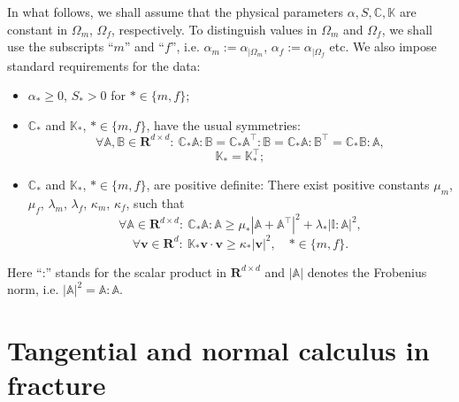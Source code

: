 \documentclass[a4paper]{article}
\numberwithin{equation}{section}
\def\CC{\tn C}
\def\Real{{\mathbf R}} %
\def\tn#1{{\mathbb{#1}}}    %
\def\vc#1{\mathbf{#1}}     %
\def\vv{\vc v}
\newcommand{\eq}[1]{\begin{equation}#1\end{equation}}
\newcommand{\eqs}[1]{\begin{equation*}#1\end{equation*}}
\begin{document}
In what follows, we shall assume that the physical parameters $\alpha,S,\CC,\tn K$ are constant in $\Omega_m$, $\Omega_f$, respectively.
To distinguish values in $\Omega_m$ and $\Omega_f$, we shall use the subscripts ``$m$'' and ``$f$'', i.e. $\alpha_m := \alpha_{|\Omega_m}$, $\alpha_f := \alpha_{|\Omega_f}$ etc.
We also impose standard requirements for the data:
\begin{itemize}
\item $\alpha_*\ge 0$, $S_*>0$ for $*\in\{m,f\}$;
\item $\CC_*$ and $\tn K_*$, $*\in\{m,f\}$, have the usual symmetries:
\eqs{ \forall \tn A,\tn B\in\Real^{d\times d}:~ \CC_*\tn A:\tn B=\CC_*\tn A^\top:\tn B=\CC_*\tn A:\tn B^\top=\CC_*\tn B:\tn A, }
\eqs{ \tn K_* = \tn K_*^\top; }
\item $\CC_*$ and $\tn K_*$, $*\in\{m,f\}$, are positive definite: %
There exist positive constants $\mu_m$, $\mu_f$, $\lambda_m$, $\lambda_f$, $\kappa_m$, $\kappa_f$, such that
\eq{ \label{eq:pos_def_C_gen} \forall\tn A\in\Real^{d\times d}:~\CC_*\tn A:\tn A \ge \mu_*\left|\tn A+\tn A^\top\right|^2 + \lambda_*|\tn I:\tn A|^2, }
\eq{ \label{eq:pos_def_K} \forall\vv\in\Real^d:~\tn K_*\vv\cdot\vv \ge \kappa_*|\vv|^2,\quad *\in\{m,f\}. }
\end{itemize}
Here ``:'' stands for the scalar product in $\Real^{d\times d}$ and $|\tn A|$ denotes the Frobenius norm, i.e. $|\tn A|^2=\tn A:\tn A$.




\section{Tangential and normal calculus in fracture}\label{sec:calculus}
\end{document}
